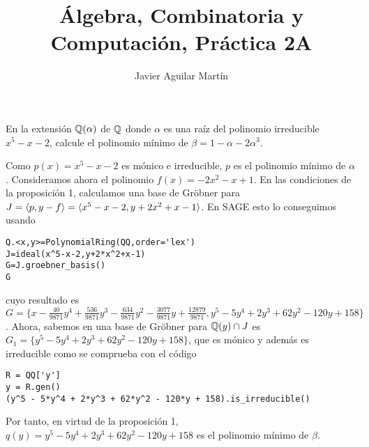 \documentclass[twoside]{article}
\begin{document}
\title{Álgebra, Combinatoria y Computación, Práctica 2A}
\author{Javier Aguilar Martín}
\maketitle

\begin{ejercicio}{1}
En la extensión $\mathbb{Q}(\alpha)$ de $\mathbb{Q}$ donde $\alpha$ es una raíz del polinomio irreducible $x^5-x-2$, calcule el polinomio mínimo de $\beta=1-\alpha-2\alpha^3$. 
\end{ejercicio}

\begin{solucion}

Como $p(x)=x^5-x-2$ es mónico e irreducible, $p$ es el polinomio mínimo de $\alpha$. Consideramos ahora el polinomio $f(x)=-2x^2-x+1$. En las condiciones de la proposición 1, calculamos una base de Gröbner para $J=\langle{p,y-f}\rangle= \langle{x^5-x-2, y+2x^2+x-1}\rangle$. 
En SAGE esto lo conseguimos usando
\begin{verbatim}
Q.<x,y>=PolynomialRing(QQ,order='lex')
J=ideal(x^5-x-2,y+2*x^2+x-1)
G=J.groebner_basis()
G
\end{verbatim}
cuyo resultado es $G=\{x - \frac{40}{9871}y^4 + \frac{536}{9871}y^3 - \frac{634}{9871}y^2 - \frac{3077}{9871}y + \frac{12879}{9871}, y^5 - 5y^4 + 2y^3 + 62y^2 - 120y + 158\}$. Ahora, sabemos en una base de Gröbner para $\mathbb{Q}(y)\cap J$ es $G_1=\{  y^5 - 5y^4 + 2y^3 + 62y^2 - 120y + 158\}$, que es mónico y además es irreducible como se comprueba con el código
\begin{verbatim}
R = QQ['y']
y = R.gen()
(y^5 - 5*y^4 + 2*y^3 + 62*y^2 - 120*y + 158).is_irreducible()
\end{verbatim}
Por tanto, en virtud de la proposición 1, $q(y)=y^5 - 5y^4 + 2y^3 + 62y^2 - 120y + 158$ es el polinomio mínimo de $\beta$. 
\end{solucion}
\end{document}
